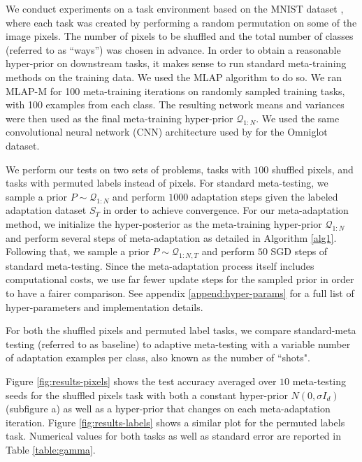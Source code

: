 \documentclass[letterpaper]{article} %
\theoremstyle{definition}
\begin{document}
We conduct experiments on a task environment based on the MNIST dataset \citep{LeCun1998}, where each task was created by performing a random permutation on some of the image pixels. The number of pixels to be shuffled and the total number of classes (referred to as ``ways'') was chosen in advance. In order to obtain a reasonable hyper-prior on downstream tasks, it makes sense to run standard meta-training methods on the training data.
We used the MLAP \citep{Amit2018} algorithm to do so. We ran MLAP-M for 100 meta-training iterations on randomly sampled training tasks, with 100 examples from each class. The resulting network means and variances were then used as the final meta-training hyper-prior $\mathcal{Q}_{1:N}$. We used the same convolutional neural network (CNN) architecture used by \citet{Vinyals2016} for the Omniglot dataset.

We perform our tests on two sets of problems, tasks with $100$ shuffled pixels, and tasks with permuted labels instead of pixels.
For standard meta-testing, we sample a prior $P\sim \mathcal{Q}_{1:N}$ and perform $1000$ adaptation steps given the labeled adaptation dataset $S_T$ in order to achieve convergence. For our meta-adaptation method, we initialize the hyper-posterior as the meta-training hyper-prior $\mathcal{Q}_{1:N}$ and
 perform several steps of meta-adaptation as detailed in Algorithm \ref{alg1}. Following that, we sample a prior $P\sim \mathcal{Q}_{1:N,T}$ and perform  $50$ SGD steps of standard meta-testing. Since the meta-adaptation process itself includes computational costs, we use far fewer update steps for the sampled prior in order to have a fairer comparison.
See appendix \ref{append:hyper-params} for a full list of hyper-parameters and implementation details.

For both the shuffled pixels and permuted label tasks, we compare standard-meta testing (referred to as baseline) to adaptive meta-testing with a variable number of adaptation examples per class, also known as the number of ``shots".

Figure \ref{fig:results-pixels} shows the test accuracy averaged over $10$ meta-testing seeds for the shuffled pixels task with both a constant hyper-prior $N(0,\sigma I_d)$ (subfigure a) as well as a hyper-prior that changes on each meta-adaptation iteration. Figure \ref{fig:results-labels} shows a similar plot for the permuted labels task. 
Numerical values for both tasks as well as standard error are reported in Table \ref{table:gamma}.
\end{document}
